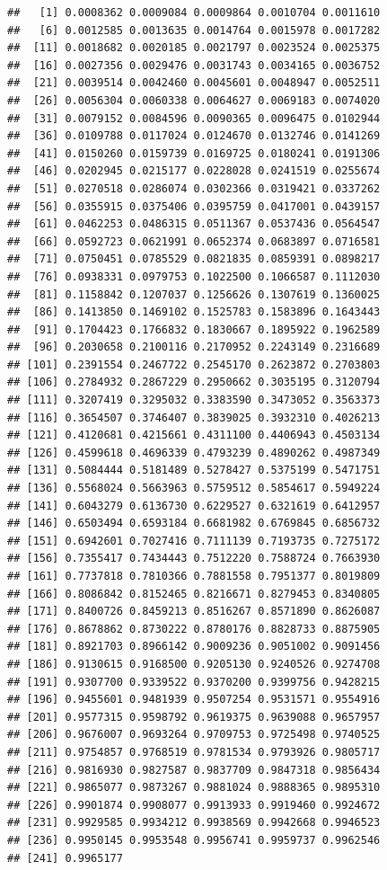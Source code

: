 \documentclass[11pt,]{krantz}
\theoremstyle{definition}
\theoremstyle{definition}
\theoremstyle{remark}
\begin{document}
\begin{verbatim}
##   [1] 0.0008362 0.0009084 0.0009864 0.0010704 0.0011610
##   [6] 0.0012585 0.0013635 0.0014764 0.0015978 0.0017282
##  [11] 0.0018682 0.0020185 0.0021797 0.0023524 0.0025375
##  [16] 0.0027356 0.0029476 0.0031743 0.0034165 0.0036752
##  [21] 0.0039514 0.0042460 0.0045601 0.0048947 0.0052511
##  [26] 0.0056304 0.0060338 0.0064627 0.0069183 0.0074020
##  [31] 0.0079152 0.0084596 0.0090365 0.0096475 0.0102944
##  [36] 0.0109788 0.0117024 0.0124670 0.0132746 0.0141269
##  [41] 0.0150260 0.0159739 0.0169725 0.0180241 0.0191306
##  [46] 0.0202945 0.0215177 0.0228028 0.0241519 0.0255674
##  [51] 0.0270518 0.0286074 0.0302366 0.0319421 0.0337262
##  [56] 0.0355915 0.0375406 0.0395759 0.0417001 0.0439157
##  [61] 0.0462253 0.0486315 0.0511367 0.0537436 0.0564547
##  [66] 0.0592723 0.0621991 0.0652374 0.0683897 0.0716581
##  [71] 0.0750451 0.0785529 0.0821835 0.0859391 0.0898217
##  [76] 0.0938331 0.0979753 0.1022500 0.1066587 0.1112030
##  [81] 0.1158842 0.1207037 0.1256626 0.1307619 0.1360025
##  [86] 0.1413850 0.1469102 0.1525783 0.1583896 0.1643443
##  [91] 0.1704423 0.1766832 0.1830667 0.1895922 0.1962589
##  [96] 0.2030658 0.2100116 0.2170952 0.2243149 0.2316689
## [101] 0.2391554 0.2467722 0.2545170 0.2623872 0.2703803
## [106] 0.2784932 0.2867229 0.2950662 0.3035195 0.3120794
## [111] 0.3207419 0.3295032 0.3383590 0.3473052 0.3563373
## [116] 0.3654507 0.3746407 0.3839025 0.3932310 0.4026213
## [121] 0.4120681 0.4215661 0.4311100 0.4406943 0.4503134
## [126] 0.4599618 0.4696339 0.4793239 0.4890262 0.4987349
## [131] 0.5084444 0.5181489 0.5278427 0.5375199 0.5471751
## [136] 0.5568024 0.5663963 0.5759512 0.5854617 0.5949224
## [141] 0.6043279 0.6136730 0.6229527 0.6321619 0.6412957
## [146] 0.6503494 0.6593184 0.6681982 0.6769845 0.6856732
## [151] 0.6942601 0.7027416 0.7111139 0.7193735 0.7275172
## [156] 0.7355417 0.7434443 0.7512220 0.7588724 0.7663930
## [161] 0.7737818 0.7810366 0.7881558 0.7951377 0.8019809
## [166] 0.8086842 0.8152465 0.8216671 0.8279453 0.8340805
## [171] 0.8400726 0.8459213 0.8516267 0.8571890 0.8626087
## [176] 0.8678862 0.8730222 0.8780176 0.8828733 0.8875905
## [181] 0.8921703 0.8966142 0.9009236 0.9051002 0.9091456
## [186] 0.9130615 0.9168500 0.9205130 0.9240526 0.9274708
## [191] 0.9307700 0.9339522 0.9370200 0.9399756 0.9428215
## [196] 0.9455601 0.9481939 0.9507254 0.9531571 0.9554916
## [201] 0.9577315 0.9598792 0.9619375 0.9639088 0.9657957
## [206] 0.9676007 0.9693264 0.9709753 0.9725498 0.9740525
## [211] 0.9754857 0.9768519 0.9781534 0.9793926 0.9805717
## [216] 0.9816930 0.9827587 0.9837709 0.9847318 0.9856434
## [221] 0.9865077 0.9873267 0.9881024 0.9888365 0.9895310
## [226] 0.9901874 0.9908077 0.9913933 0.9919460 0.9924672
## [231] 0.9929585 0.9934212 0.9938569 0.9942668 0.9946523
## [236] 0.9950145 0.9953548 0.9956741 0.9959737 0.9962546
## [241] 0.9965177
\end{verbatim}
\end{document}
